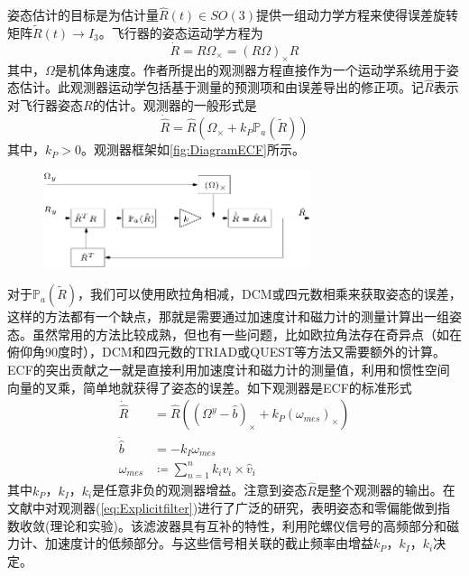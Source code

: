 \documentclass[
  type=master
]{gdutthesis}
\begin{document}
姿态估计的目标是为估计量$\hat{R}(t)\in SO(3)$提供一组动力学方程来使得误差旋转矩阵$\widetilde{R}(t)\rightarrow I_3$。飞行器的姿态运动学方程为
\begin{equation}\label{eq:kinematics}
	\dot{R}=R\Omega_{\times}=(R\Omega)_{\times}R
\end{equation}
其中，$\Omega$是机体角速度。作者所提出的观测器方程直接作为一个运动学系统用于姿态估计。此观测器运动学包括基于测量的预测项和由误差导出的修正项。记$\hat{R}$表示对飞行器姿态$R$的估计。观测器的一般形式是
\begin{equation}\label{eq:passivefilter}
	\dot{\hat{R}}=\hat{R}(\Omega_{\times}+k_P \mathbb{P}_a(\widetilde{R}))
\end{equation}
其中，$k_P>0$。观测器框架如\autoref{fig:DiagramECF}所示。
\begin{figure}[htbp]
	\centering
	\includegraphics[width=0.7\textwidth]{Block-diagram-of-the-simplified-form-of-the-passive-complementary-filter.png}
	\label{fig:DiagramECF}
\end{figure}
对于$\mathbb{P}_a(\widetilde{R})$，我们可以使用欧拉角相减，DCM或四元数相乘来获取姿态的误差，这样的方法都有一个缺点，那就是需要通过加速度计和磁力计的测量计算出一组姿态。虽然常用的方法比较成熟，但也有一些问题，比如欧拉角法存在奇异点（如在俯仰角90度时），DCM和四元数的TRIAD或QUEST等方法又需要额外的计算。ECF的突出贡献之一就是直接利用加速度计和磁力计的测量值，利用和惯性空间向量的叉乘，简单地就获得了姿态的误差。如下观测器是ECF的标准形式
\begin{equation}\label{eq:Explicitfilter}
	\begin{aligned}
	\dot{\hat{R}}&=\hat{R}((\Omega^y - \hat{b})_{\times}+k_P (\omega_{mes})_{\times})\\
	\dot{\hat{b}}&=-k_I \omega_{mes}\\
	\omega_{mes} &\coloneqq \sum_{n=1}^{n} k_i v_i \times \hat{v}_i	
	\end{aligned}
\end{equation}
其中$k_P$，$k_I$，$k_i$是任意非负的观测器增益。注意到姿态$\hat{R}$是整个观测器的输出。在文献\cite{mahony2008nonlinear}中对观测器(\autoref{eq:Explicitfilter})进行了广泛的研究，表明姿态和零偏能做到指数收敛(理论和实验)。该滤波器具有互补的特性，利用陀螺仪信号的高频部分和磁力计、加速度计的低频部分\cite{mahony2008nonlinear}。与这些信号相关联的截止频率由增益$k_P$，$k_I$，$k_i$决定。\par
\end{document}
